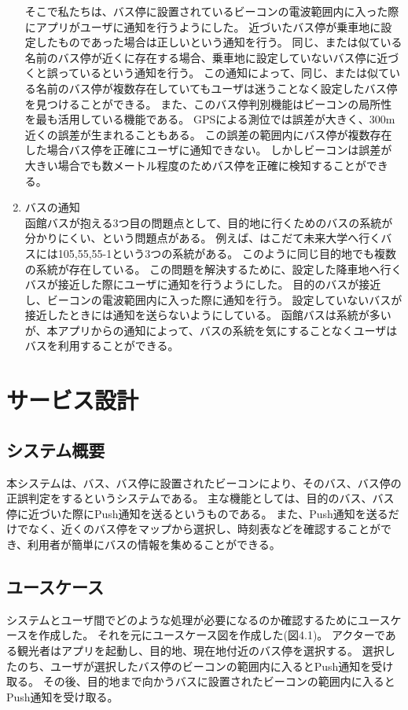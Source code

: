 \documentclass[openany,11pt,papersize]{jsbook}
\begin{document}
\begin{enumerate}
そこで私たちは、バス停に設置されているビーコンの電波範囲内に入った際にアプリがユーザに通知を行うようにした。
近づいたバス停が乗車地に設定したものであった場合は正しいという通知を行う。
同じ、または似ている名前のバス停が近くに存在する場合、乗車地に設定していないバス停に近づくと誤っているという通知を行う。
この通知によって、同じ、または似ている名前のバス停が複数存在していてもユーザは迷うことなく設定したバス停を見つけることができる。
また、このバス停判別機能はビーコンの局所性を最も活用している機能である。
GPSによる測位では誤差が大きく、300m近くの誤差が生まれることもある。
この誤差の範囲内にバス停が複数存在した場合バス停を正確にユーザに通知できない。
しかしビーコンは誤差が大きい場合でも数メートル程度のためバス停を正確に検知することができる。
\item バスの通知\mbox{}\\
函館バスが抱える3つ目の問題点として、目的地に行くためのバスの系統が分かりにくい、という問題点がある。
例えば、はこだて未来大学へ行くバスには105,55,55-1という3つの系統がある。
このように同じ目的地でも複数の系統が存在している。
この問題を解決するために、設定した降車地へ行くバスが接近した際にユーザに通知を行うようにした。
目的のバスが接近し、ビーコンの電波範囲内に入った際に通知を行う。
設定していないバスが接近したときには通知を送らないようにしている。
函館バスは系統が多いが、本アプリからの通知によって、バスの系統を気にすることなくユーザはバスを利用することができる。

\end{enumerate}


\section{サービス設計}

\subsection{システム概要}
本システムは、バス、バス停に設置されたビーコンにより、そのバス、バス停の正誤判定をするというシステムである。
主な機能としては、目的のバス、バス停に近づいた際にPush通知を送るというものである。
また、Push通知を送るだけでなく、近くのバス停をマップから選択し、時刻表などを確認することができ、利用者が簡単にバスの情報を集めることができる。


\subsection{ユースケース}
システムとユーザ間でどのような処理が必要になるのか確認するためにユースケースを作成した。
それを元にユースケース図を作成した(図4.1)。
アクターである観光者はアプリを起動し、目的地、現在地付近のバス停を選択する。
選択したのち、ユーザが選択したバス停のビーコンの範囲内に入るとPush通知を受け取る。
その後、目的地まで向かうバスに設置されたビーコンの範囲内に入るとPush通知を受け取る。
\end{document}

